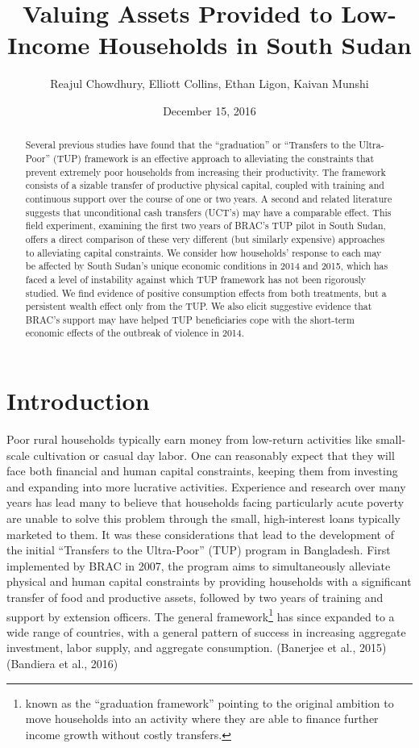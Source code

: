 \documentclass[12pt,article]{article}
\author{Reajul Chowdhury, Elliott Collins, Ethan Ligon, Kaivan Munshi}
\date{December 15, 2016}
\title{Valuing Assets Provided to Low-Income Households in South Sudan}
\begin{document}
\maketitle

\begin{abstract}


Several previous studies have found that the ``graduation'' or ``Transfers to the
Ultra-Poor'' (TUP) framework is an effective approach to alleviating the constraints
that prevent extremely poor households from increasing their productivity. The
framework consists of a sizable transfer of productive physical capital, coupled with
training and continuous support over the course of one or two years. A second and
related literature suggests that unconditional cash transfers (UCT's) may have a
comparable effect. This field experiment, examining the first two years of BRAC's TUP
pilot in South Sudan, offers a direct comparison of these very different (but
similarly expensive) approaches to alleviating capital constraints. We consider how
households' response to each may be affected by South Sudan's unique economic
conditions in 2014 and 2015, which has faced a level of instability against which TUP
framework has not been rigorously studied. We find evidence of positive consumption
effects from both treatments, but a persistent wealth effect only from the TUP. We
also elicit suggestive evidence that BRAC's support may have helped TUP beneficiaries
cope with the short-term economic effects of the outbreak of violence in 2014.
\end{abstract}
\newpage

\section{Introduction}
\label{sec:orgheadline1}

Poor rural households typically earn money from low-return activities like
small-scale cultivation or casual day labor. One can reasonably expect that they will
face both financial and human capital constraints, keeping them from investing 
and expanding into more lucrative activities. Experience and research over many years
has lead many to believe that households facing particularly acute poverty are unable
to solve this problem through the small, high-interest loans typically marketed to
them. It was these considerations that lead to the development of the initial
``Transfers to the Ultra-Poor'' (TUP) program in Bangladesh. First implemented by
BRAC in 2007, the program aims to simultaneously alleviate physical and human capital
constraints by providing households with a significant transfer of food and productive assets,
followed by two years of training and support by extension officers. The general
framework\footnote{known as the ``graduation framework'' pointing to the original
ambition to move households into an activity where they are able to finance further
income growth without costly transfers.}
has since expanded to a wide range of countries, with a general pattern of
success in increasing aggregate investment, labor supply, and aggregate consumption.
(Banerjee et al., 2015) (Bandiera et al., 2016)
\end{document}
